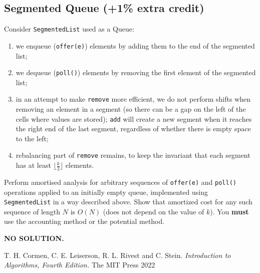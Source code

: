 \documentclass{article}
\begin{document}
\subsection*{Segmented Queue (+1\% extra credit)}

Consider \texttt{SegmentedList} used as a Queue:
\begin{enumerate}
    \item we enqueue (\texttt{offer(e)}) elements by adding them to the end of the segmented list;
    \item we dequeue (\texttt{poll()}) elements by removing the first element of the segmented list;
    \item in an attempt to make \texttt{remove} more efficient, we do not perform shifts when removing an element in a segment (so there can be a gap on the left of the cells where values are stored); \texttt{add} will create a new segment when it reaches the right end of the last segment, regardless of whether there is empty space to the left;
    \item rebalancing part of \texttt{remove} remains, to keep the invariant that each segment has at least $\lfloor\frac{k}{2}\rfloor$ elements.
\end{enumerate}

Perform amortised analysis for arbitrary sequences of \texttt{offer(e)} and \texttt{poll()} operations applied to an initially empty queue, implemented using \texttt{SegmentedList} in a way described above. Show that amortized cost for any such sequence of length $N$ is $O(N)$ (does not depend on the value of $k$). You \textbf{must} use the accounting method or the potential method.

\textbf{NO SOLUTION.}

\begin{thebibliography}{9}
  T. H. Cormen, C. E. Leiserson, R. L. Rivest and C. Stein.
  \textit{Introduction to Algorithms, Fourth Edition.}
  The MIT Press
  2022
\end{thebibliography}
\end{document}

